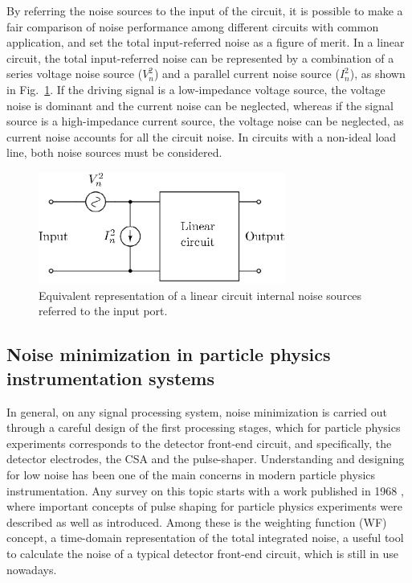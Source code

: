 By referring the noise sources to the input of the circuit, it is possible to make a fair comparison of noise performance among different circuits with common application, and set the total input-referred noise as a figure of merit. In a linear circuit, the total \mbox{input-referred} noise can be represented by a combination of a series voltage noise source ($V_n^2$) and a parallel current noise source ($I_n^2$), as shown in Fig.~\ref{fig:noise_cir}. If the driving signal is a low-impedance voltage source, the voltage noise is dominant and the current noise can be neglected, whereas if the signal source is a high-impedance current source, the voltage noise can be neglected, as current noise accounts for all the circuit noise. In circuits with a non-ideal load line, both noise sources must be considered.

\begin{figure}[!t]
	\centering
	\includegraphics[width=3.2in]{./Figures/noise_cir}
	\caption[Linear circuit with internal noise sources referred to the input port.]{Equivalent representation of a linear circuit internal noise sources referred to the input port.}\label{fig:noise_cir}
\end{figure}

\subsection{Noise minimization in particle physics instrumentation systems}
In general, on any signal processing system, noise minimization is carried out through a careful design of the first processing stages, which for particle physics experiments corresponds to the detector front-end circuit, and specifically, the detector electrodes, the CSA and the \mbox{pulse-shaper}. Understanding and designing for low noise has been one of the main concerns in modern particle physics instrumentation. Any survey on this topic starts with a work published in 1968 \citep{radeka104}, where important concepts of pulse shaping for particle physics experiments were described as well as introduced. Among these is the weighting function (WF) concept, a time-domain representation of the total integrated noise, a useful tool to calculate the noise of a typical detector front-end circuit, which is still in use nowadays. 

